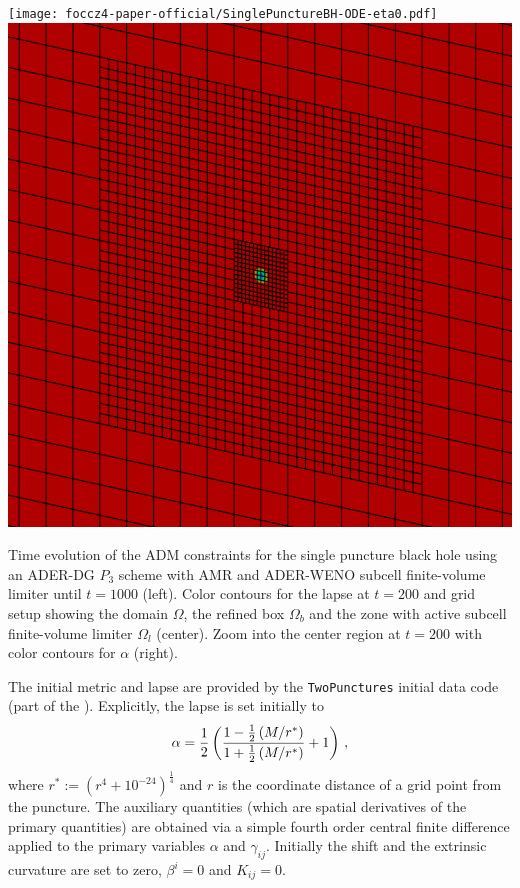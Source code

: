 \begin{marginfigure}
	\texttt{[image: foccz4-paper-official/SinglePunctureBH-ODE-eta0.pdf]}
	\includegraphics[width=\textwidth]{foccz4-paper-amended/OnePunctureODE-zoom.png}
	\caption[
	Single puncture black hole, constraint evolution 
	]{Time evolution of the ADM constraints for the single
		puncture black hole using an ADER-DG $P_3$ scheme with AMR and
		ADER-WENO subcell finite-volume limiter until $t=1000$ (left). Color
		contours for the lapse at $t=200$ and grid setup showing the domain
		$\Omega$, the refined box $\Omega_b$ and the zone with active subcell
		finite-volume limiter $\Omega_l$ (center). Zoom into the center
		region at $t=200$ with color contours for $\alpha$ (right).}
	\label{fig.puncture}
\end{marginfigure}

% 
The initial metric and lapse are provided by the \texttt{TwoPunctures}
initial data code \cite{Ansorg:2004ds} (part of the 
 \cite{loeffler_2011_et}). Explicitly, the lapse is set initially
to
\begin{equation}
    \alpha = \frac{1}{2} \left(\frac{1-\frac{1}{2} \left({M}/{r^*}\right)}{1+\frac{1}{2}
        \left({M}/{r^*}\right)}+1\right)\,,
\end{equation}
%
where $r^*:=(r^4+10^{-24})^{\frac{1}{4}}$ and $r$ is the coordinate
distance of a grid point from the puncture. The auxiliary quantities
(which are spatial derivatives of the primary quantities) are obtained
via a simple fourth order central finite difference applied to the
primary variables $\alpha$ and $\gamma_{ij}$. Initially the shift and the
extrinsic curvature are set to zero, \ie $\beta^i = 0$ and $K_{ij}=0$.

